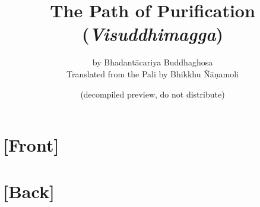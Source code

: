 \documentclass[a4paper]{book}
\newif\ifplastex\plastexfalse
\def\frontmatter{\setcounter{part}{-1}\part{[Front]}} %
\def\backmatter{\setcounter{part}{-1}\part{[Back]}}
\let\origbackmatter\backmatter
\def\backmatter{\origbackmatter\pagestyle{vismNoBody}}
\begin{document}
	\title{The Path of Purification \\ (\emph{Visuddhimagga})}
	\date{(decompiled preview, do not distribute)}
	\ifplastex
		\author{by \\ Bhadantācariya Buddhaghosa \and Translated from the Pali by \\ Bhikkhu Ñāṇamoli}
	\else
		\author{by Bhadantācariya Buddhaghosa \\ Translated from the Pali by Bhikkhu Ñāṇamoli}
	\fi
	\maketitle

	\frontmatter
		\tableofcontents
		\def\thesection{\arabic{section}}
		
	\backmatter
		
		
		
\end{document}
